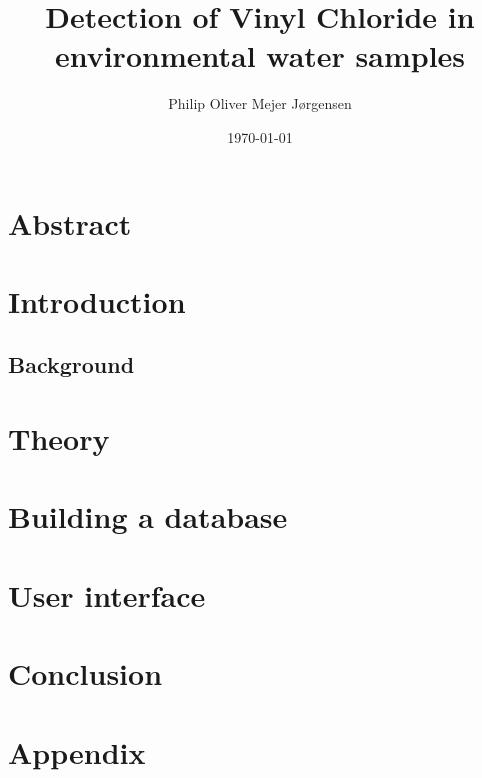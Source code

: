 \documentclass{article}
\title{Detection of Vinyl Chloride in environmental water samples}
\author{Philip Oliver Mejer Jørgensen}
\date{\today}
\begin{document}
\maketitle

\newpage

\tableofcontents

\newpage

\section{Abstract}

\section{Introduction}
\subsection{Background}

\section{Theory}


\section{Building a database}


\section{User interface}


\section{Conclusion}

\section{Appendix}
\end{document}
